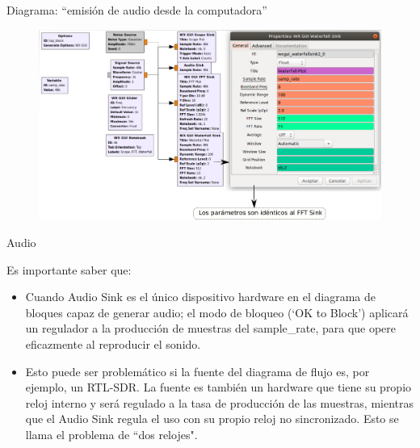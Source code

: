 \begin{frame}{Diagrama:  “emisión de audio desde la computadora”}

\begin{figure}

\begin{center}
\vspace{-8mm}
\includegraphics[width=1.05\textwidth]{parte1/lab3/pdf/lab3_4.pdf}
\end{center}
\end{figure}

\end{frame}

\begin{frame}{Audio}

Es importante saber que:\\
\begin{itemize}
    \item
    {Cuando Audio Sink es el único dispositivo hardware en el diagrama de bloques capaz de generar audio; el modo de bloqueo (‘OK to Block’) aplicará un regulador a la producción de muestras del sample\_rate, para que opere eficazmente al reproducir el sonido.}
    \item
    {Esto puede ser problemático si la fuente del diagrama de flujo es, por ejemplo, un RTL-SDR. La fuente es también un hardware que tiene su propio reloj interno y será regulado a la tasa de producción de las muestras, mientras que el Audio Sink regula el uso con su propio reloj no sincronizado. Esto se llama el problema de “dos relojes".}
\end{itemize}
\end{frame}


